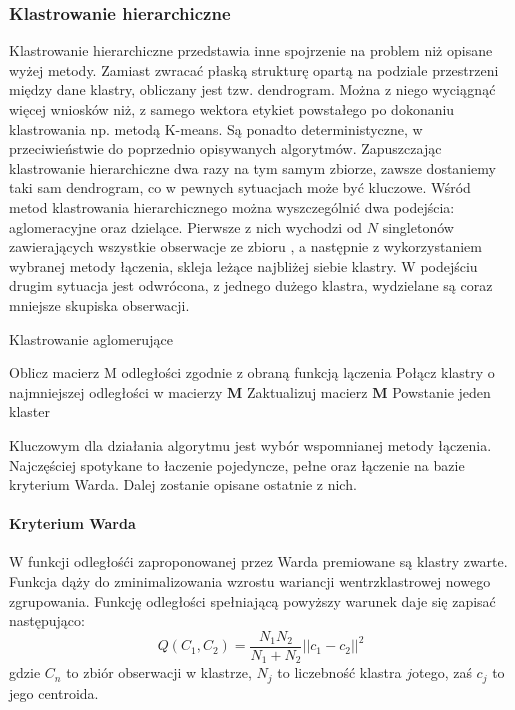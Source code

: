 \documentclass{article}
\begin{document}
\subsubsection{Klastrowanie hierarchiczne}
Klastrowanie hierarchiczne przedstawia inne spojrzenie na problem niż opisane wyżej metody. Zamiast zwracać płaską strukturę opartą na podziale przestrzeni między dane klastry, obliczany jest tzw. dendrogram. 
Można z niego wyciągnąć więcej wniosków niż, z samego wektora etykiet powstałego po dokonaniu klastrowania np. metodą K-means.
Są ponadto deterministyczne, w przeciwieństwie do poprzednio opisywanych algorytmów.
Zapuszczając klastrowanie hierarchiczne dwa razy na tym samym zbiorze, zawsze dostaniemy taki sam dendrogram, co w pewnych sytuacjach może być kluczowe.
Wśród metod klastrowania hierarchicznego można wyszczególnić dwa podejścia: aglomeracyjne oraz dzielące.
Pierwsze z nich wychodzi od $N$ singletonów zawierających wszystkie obserwacje ze zbioru , a następnie z wykorzystaniem wybranej metody łączenia, skleja leżące najbliżej siebie klastry. 
W podejściu drugim sytuacja jest odwrócona, z jednego dużego klastra, wydzielane są coraz mniejsze skupiska obserwacji\citep{Jain1988}.


\begin{algorithm}
\label{agglomerative}
\caption{Klastrowanie aglomerujące}
\begin{algorithmic}[1]
\STATE Oblicz macierz M odległości zgodnie z obraną funkcją lączenia
\REPEAT
\STATE Połącz klastry o najmniejszej odległości w macierzy $\textbf{M}$ 
\STATE Zaktualizuj macierz $\textbf{M}$ 
\UNTIL Powstanie jeden klaster
\end{algorithmic}
\end{algorithm}


Kluczowym dla działania algorytmu jest wybór wspomnianej metody łączenia.
Najczęściej spotykane to łaczenie pojedyncze, pełne oraz łączenie na bazie kryterium Warda. 
Dalej zostanie opisane ostatnie z nich.


\paragraph{Kryterium Warda}
W funkcji odległośći zaproponowanej przez Warda premiowane są klastry zwarte.
Funkcja dąży do zminimalizowania wzrostu wariancji wentrzklastrowej nowego zgrupowania.
Funkcję odległości spełniającą powyższy warunek daje się zapisać następująco:
\[ Q(C_1, C_2) = \frac{N_1N_2}{N_1 + N_2}||c_1 - c_2||^2 \]
gdzie $C_n$ to zbiór obserwacji w klastrze, $N_j$ to liczebność klastra $j$otego, zaś $c_j$ to jego centroida.
\end{document}
